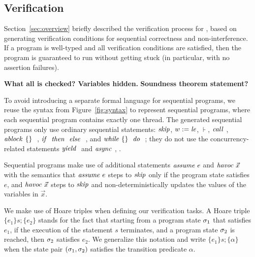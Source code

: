 

\subsection{Verification}
\label{sec:verification}

Section~\ref{sec:overview} briefly described the verification process for \civl, based on generating verification conditions for sequential correctness and non-interference.
If a program is well-typed and all verification conditions are satisfied, then the program is guaranteed to run without getting stuck (in particular, with no assertion failures). 

{\bf What all is checked? Variables hidden. }
{\bf Soundness theorem statement?}

To avoid introducing a separate formal language for sequential programs, we reuse the syntax from Figure~\ref{fig:syntax} to represent sequential programs, where each sequential program contains exactly one thread.
The generated sequential programs only use ordinary sequential statements:
$\mathit{skip}$, $w := \mathit{le}$, $\assert{}$, $\call{}$, $\mathit{ablock}^{}\ {\{\}}\ {}\ $, ${\mathit{if}\ {}\ }{\mathit{then}\ {}\ }{\mathit{else}\ {}\ }$, and $\mathit{while}\ \{{}\}\ {{}\ } \mathit{do}\ {{}\ }$;
they do not use the concurrency-related statements $\yield$ and $\mathit{async}\ $, .

Sequential programs make use of additional statements  $\mathit{assume}\ e$ and $\mathit{havoc}\ \vec{x}$ with the semantics that $\mathit{assume}\ e$ steps to $\mathit{skip}$ only if the program state satisfies $e$, and $\mathit{havoc}\ \vec{x}$ steps to $\mathit{skip}$ and non-deterministically updates the values of the variables in $\vec{x}$. 

We make use of Hoare triples when defining our verification tasks. A Hoare triple $\{e_1\} s; \{e_2\}$ stands for the fact that starting from a program state $\sigma_1$ that satisfies $e_1$, if the execution of the statement $s$ terminates, and a program state $\sigma_2$ is reached, then $\sigma_2$ satisfies $e_2$. We generalize this notation and write $\{e_1\} s; \{\alpha\}$ when the state pair $(\sigma_1,\sigma_2)$ satisfies the transition predicate $\alpha$. 

